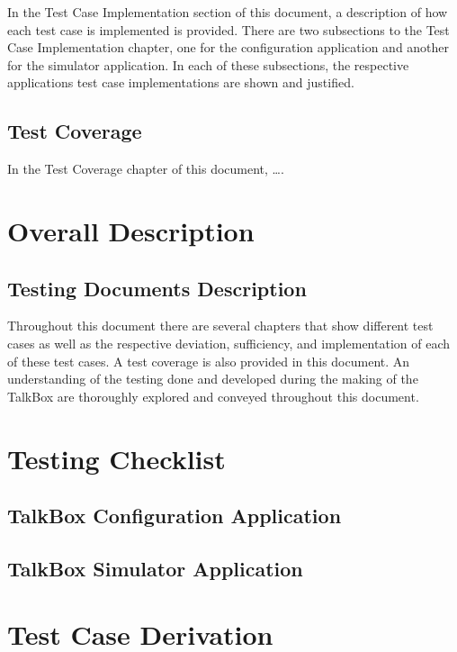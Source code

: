 In the Test Case Implementation section of this document, a description of how each test case is implemented is provided. There are two subsections to the Test Case Implementation chapter, one for the configuration application and another for the simulator application. In each of these subsections, the respective applications test case implementations are shown and justified.


\section{Test Coverage}

In the Test Coverage chapter of this document, ….


\chapter{Overall Description}
\label{Overall Description}

\section{Testing Documents Description}

Throughout this document there are several chapters that show different test cases as well as the respective deviation, sufficiency, and implementation of each of these test cases. A test coverage is also provided in this document. An understanding of the testing done and developed during the making of the TalkBox are thoroughly explored and conveyed throughout this document. 

\newpage

\chapter{Testing Checklist}
\label{External Interface Requirements}

\section{TalkBox Configuration Application}
\section{TalkBox Simulator Application}

\chapter{Test Case Derivation}
\label{System Features}

